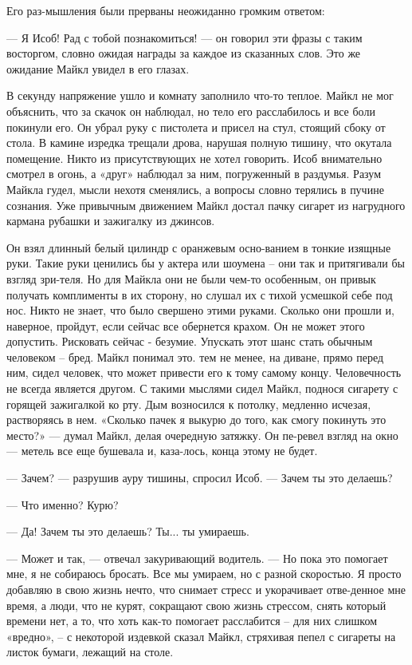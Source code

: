 Его раз-мышления были прерваны неожиданно громким ответом:

— Я Исоб! Рад с тобой познакомиться! — он говорил эти фразы с таким восторгом, словно ожидая награды за каждое из сказанных слов. Это же ожидание Майкл увидел в его глазах.

В секунду напряжение ушло и комнату заполнило что-то теплое. Майкл не мог объяснить, что за скачок он наблюдал, но тело его расслабилось и все боли покинули его. Он убрал руку с пистолета и присел на стул, стоящий сбоку от стола. В камине изредка трещали дрова, нарушая полную тишину, что окутала помещение. Никто из присутствующих не хотел говорить. Исоб внимательно смотрел в огонь, а «друг» наблюдал за ним, погруженный в раздумья. Разум Майкла гудел, мысли нехотя сменялись, а вопросы словно терялись в пучине сознания. Уже привычным движением Майкл достал пачку сигарет из нагрудного кармана рубашки и зажигалку из джинсов.

Он взял длинный белый цилиндр с оранжевым осно-ванием в тонкие изящные руки. Такие руки ценились бы у актера или шоумена – они так и притягивали бы взгляд зри-теля. Но для Майкла они не были чем-то особенным, он привык получать комплименты в их сторону, но слушал их с тихой усмешкой себе под нос. Никто не знает, что было свершено этими руками. Сколько они прошли и, наверное, пройдут, если сейчас все обернется крахом. Он не может этого допустить. Рисковать сейчас - безумие. Упускать этот шанс стать обычным человеком – бред. Майкл понимал это. тем не менее, на диване, прямо перед ним, сидел человек, что может привести его к тому самому концу. Человечность не всегда является другом. С такими мыслями сидел Майкл, поднося сигарету с горящей зажигалкой ко рту. Дым возносился к потолку, медленно исчезая, растворяясь в нем. «Сколько пачек я выкурю до того, как смогу покинуть это место?» — думал Майкл, делая очередную затяжку. Он пе-ревел взгляд на окно — метель все еще бушевала и, каза-лось, конца этому не будет.

— Зачем? — разрушив ауру тишины, спросил Исоб. — Зачем ты это делаешь?

— Что именно? Курю? 

— Да! Зачем ты это делаешь? Ты... ты умираешь.

— Может и так, — отвечал закуривающий водитель. — Но пока это помогает мне, я не собираюсь бросать. Все мы умираем, но с разной скоростью. Я просто добавляю в свою жизнь нечто, что снимает стресс и укорачивает отве-денное мне время, а люди, что не курят, сокращают свою жизнь стрессом, снять который времени нет, а то, что хоть как-то помогает расслабится – для них слишком «вредно», – с некоторой издевкой сказал Майкл, стряхивая пепел с сигареты на листок бумаги, лежащий на столе.


